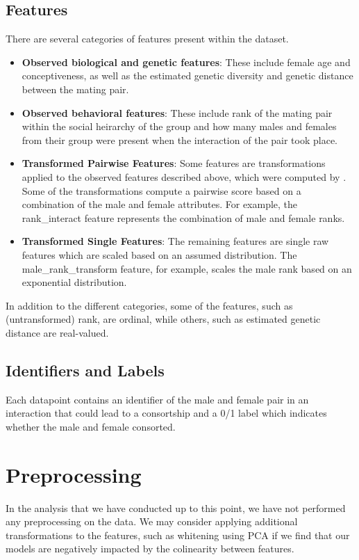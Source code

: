\documentclass[twoside,twocolumn,paper=letter]{article}
\begin{document}
\subsection{Features}
There are several categories of features present within the dataset.
\begin{itemize}
  \item{\textbf{Observed biological and genetic features}: These include female age
    and conceptiveness, as well as the estimated genetic diversity and genetic
    distance between the mating pair.}
  \item{\textbf{Observed behavioral features}: These include rank of the mating pair
    within the social heirarchy of the group and how many males and females from
    their group were present when the interaction of the pair took place.}
  \item{\textbf{Transformed Pairwise Features}: Some features are
    transformations applied to the observed features described above, which were
    computed by \cite{Tung:2012}. Some of the transformations compute a pairwise
    score based on a combination of the male and female attributes. For example,
    the rank\_interact feature represents the combination of male and female
    ranks.
    }
  \item{\textbf{Transformed Single Features}: The remaining features are single
    raw features which are scaled based on an assumed distribution.  The
    male\_rank\_transform feature, for example, scales the male rank based on an
    exponential distribution.}
\end{itemize}

In addition to the different categories, some of the features, such as
(untransformed) rank, are ordinal, while others, such as estimated genetic
distance are real-valued.

\subsection{Identifiers and Labels}
Each datapoint contains an identifier of the male and female pair in an
interaction that could lead to a consortship and a 0/1 label which indicates
whether the male and female consorted.

\section{Preprocessing}

In the analysis that we have conducted up to this point, we have not performed
any preprocessing on the data. We may consider applying additional
transformations to the features, such as whitening using PCA if we find that our
models are negatively impacted by the colinearity between features.
\end{document}
